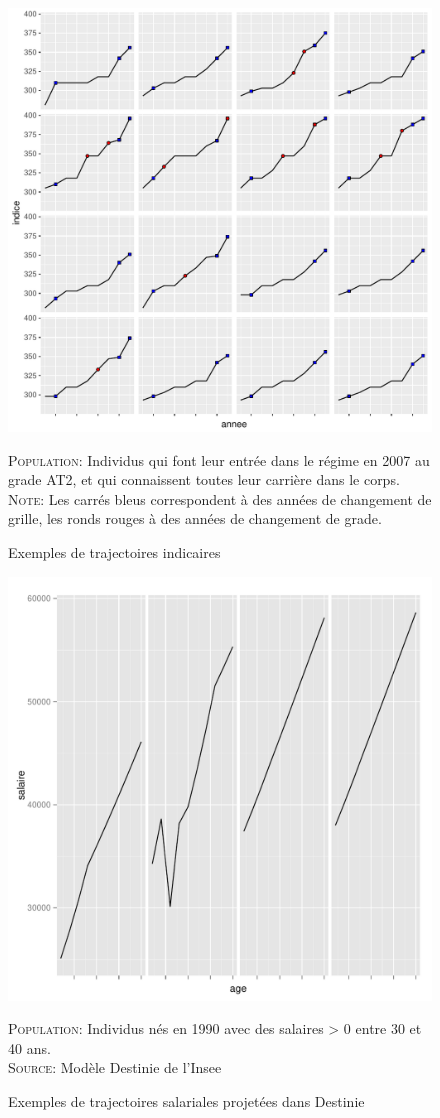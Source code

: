 \documentclass[11pt,a4paper]{article}
\begin{document}
\begin{figure}[ht] 
\caption{Exemples de trajectoires indicaires}
\label{trajectories} 
\includegraphics[width=1\linewidth]{trajectoires.pdf} 
\begin{minipage}{15cm}
\footnotesize
\textsc{Population:} Individus qui font leur entrée dans le régime en 2007 au grade AT2, et qui connaissent toutes leur carrière dans le corps. \\
\textsc{Note:} Les carrés bleus correspondent à des années de changement de grille, les ronds rouges à des années de changement de grade. 
\end{minipage}
\end{figure}



\begin{figure}[ht] 
\caption{Exemples de trajectoires salariales projetées dans Destinie}
\label{trajectories} 
\includegraphics[width=1\linewidth, height = 0.5\linewidth]{trajectoires_D.pdf} 
\begin{minipage}{12cm}
\footnotesize
\textsc{Population:} Individus nés en 1990 avec des salaires > 0 entre 30 et 40 ans. \\
\textsc{Source:} Modèle Destinie de l'Insee
\end{minipage}
\end{figure}
\end{document}
